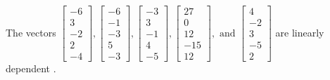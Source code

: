 \begin{exercise}
\begin{exerciseStatement}
  \end{exerciseStatement}
  \begin{exerciseAnswer}
   The vectors \(\left[\begin{array}{r}
-6 \\
3 \\
-2 \\
2 \\
-4
\end{array}\right] , \left[\begin{array}{r}
-6 \\
-1 \\
-3 \\
5 \\
-3
\end{array}\right] , \left[\begin{array}{r}
-3 \\
3 \\
-1 \\
4 \\
-5
\end{array}\right] , \left[\begin{array}{r}
27 \\
0 \\
12 \\
-15 \\
12
\end{array}\right] , \text{ and } \left[\begin{array}{r}
4 \\
-2 \\
3 \\
-5 \\
2
\end{array}\right]\) are 
  	 linearly dependent  .
  


  \end{exerciseAnswer}
\end{exercise}